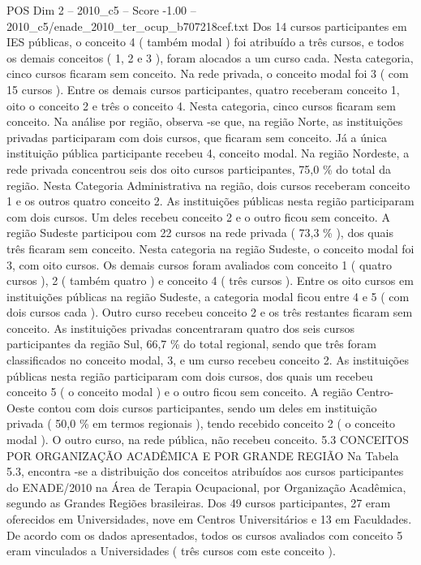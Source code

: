 \begin{textsample}{POS Dim 2 – 2010\_c5 – Score -1.00 – 2010\_c5/enade\_2010\_ter\_ocup\_b707218cef.txt}
Dos 14 cursos participantes em IES públicas, o conceito 4 ( também modal ) foi atribuído a três cursos, e todos os demais conceitos ( 1, 2 e 3 ), foram alocados a um curso cada.
Nesta categoria, cinco cursos ficaram sem conceito.
Na rede privada, o conceito modal foi 3 ( com 15 cursos ).
Entre os demais cursos participantes, quatro receberam conceito 1, oito o conceito 2 e três o conceito 4.
Nesta categoria, cinco cursos ficaram sem conceito.
Na análise por região, observa -se que, na região Norte, as instituições privadas participaram com dois cursos, que ficaram sem conceito.
Já a única instituição pública participante recebeu 4, conceito modal.
Na região Nordeste, a rede privada concentrou seis dos oito cursos participantes, 75,0 \% do total da região.
Nesta Categoria Administrativa na região, dois cursos receberam conceito 1 e os outros quatro conceito 2.
As instituições públicas nesta região participaram com dois cursos.
Um deles recebeu conceito 2 e o outro ficou sem conceito.
A região Sudeste participou com 22 cursos na rede privada ( 73,3 \% ), dos quais três ficaram sem conceito.
Nesta categoria na região Sudeste, o conceito modal foi 3, com oito cursos.
Os demais cursos foram avaliados com conceito 1 ( quatro cursos ), 2 ( também quatro ) e conceito 4 ( três cursos ).
Entre os oito cursos em instituições públicas na região Sudeste, a categoria modal ficou entre 4 e 5 ( com dois cursos cada ).
Outro curso recebeu conceito 2 e os três restantes ficaram sem conceito.
As instituições privadas concentraram quatro dos seis cursos participantes da região Sul, 66,7 \% do total regional, sendo que três foram classificados no conceito modal, 3, e um curso recebeu conceito 2.
As instituições públicas nesta região participaram com dois cursos, dos quais um recebeu conceito 5 ( o conceito modal ) e o outro ficou sem conceito.
A região Centro-Oeste contou com dois cursos participantes, sendo um deles em instituição privada ( 50,0 \% em termos regionais ), tendo recebido conceito 2 ( o conceito modal ).
O outro curso, na rede pública, não recebeu conceito. 5.3 CONCEITOS POR ORGANIZAÇÃO ACADÊMICA E POR GRANDE REGIÃO Na Tabela 5.3, encontra -se a distribuição dos conceitos atribuídos aos cursos participantes do ENADE/2010 na Área de Terapia Ocupacional, por Organização Acadêmica, segundo as Grandes Regiões brasileiras.
Dos 49 cursos participantes, 27 eram oferecidos em Universidades, nove em Centros Universitários e 13 em Faculdades.
De acordo com os dados apresentados, todos os cursos avaliados com conceito 5 eram vinculados a Universidades ( três cursos com este conceito ).

\end{textsample}
